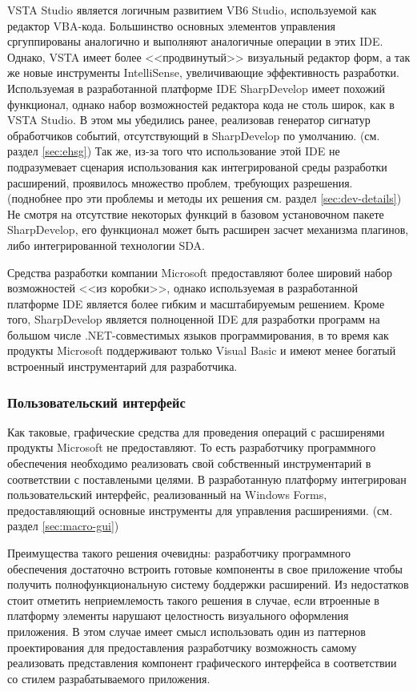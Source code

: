 VSTA Studio является логичным развитием VB6 Studio, используемой как редактор VBA-кода. Большинство основных элементов управления сргуппированы аналогично и выполняют аналогичные операции в этих IDE. Однако, VSTA имеет более <<продвинутый>> визуальный редактор форм, а так же новые инструменты IntelliSense, увеличивающие эффективность разработки. Используемая в разработанной платформе IDE SharpDevelop имеет похожий функционал, однако набор возможностей редактора кода не столь широк, как в VSTA Studio. В этом мы убедились ранее, реализовав генератор сигнатур обработчиков событий, отсутствующий в SharpDevelop по умолчанию. (см. раздел \ref{sec:ehsg}) Так же, из-за того что использование этой IDE не подразумевает сценария использования как интегрированой среды разработки расширений, проявилось множество проблем, требующих разрешения. (поднобнее про эти проблемы и методы их решения см. раздел \ref{sec:dev-details}) Не смотря на отсутствие некоторых функций в базовом установочном пакете SharpDevelop, его функционал может быть расширен засчет механизма плагинов, либо интегрированной технологии SDA.

Средства разработки компании Microsoft предоставляют более шировий набор возможностей <<из коробки>>, однако используемая в разработанной платформе IDE является более гибким и масштабируемым решением. Кроме того, SharpDevelop является полноценной IDE для разработки программ на большом числе .NET-совместимых языков программирования, в то время как продукты Microsoft поддерживают только Visual Basic и имеют менее богатый встроенный инструментарий для разработчика.

\subsubsection{Пользовательский интерфейс}

Как таковые, графические средства для проведения операций с расширенями продукты Microsoft не предоставляют. То есть разработчику программного обеспечения необходимо реализовать свой собственный инструментарий в соответствии с поставлеными целями. В разработанную платформу интегрирован пользовательский интерфейс, реализованный на Windows Forms, предоставляющий основные инструменты для управления расширениями. (см. раздел \ref{sec:macro-gui})

Преимущества такого решения очевидны: разработчику программного обеспечения достаточно встроить готовые компоненты в свое приложение чтобы получить полнофункциональную систему боддержки расширений. Из недостатков стоит отметить неприемлемость такого решения в случае, если втроенные в платформу элементы нарушают целостность визуального оформления приложения. В этом случае имеет смысл использовать один из паттернов проектирования для предоставления разработчику возможность самому реализовать представления компонент графического интерфейса в соответствии со стилем разрабатываемого приложения.

